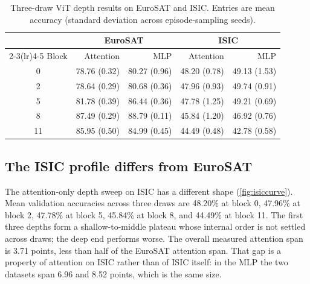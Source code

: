 \documentclass[11pt]{article}
\begin{document}
\begin{table}[t]
\centering
\small
\caption{Three-draw ViT depth results on EuroSAT and ISIC. Entries are mean accuracy (standard deviation across episode-sampling seeds).}
\label{tab:depthmeans}
\begin{tabular}{crrrr}
\toprule
& \multicolumn{2}{c}{EuroSAT} & \multicolumn{2}{c}{ISIC}\\
\cmidrule(lr){2-3}\cmidrule(lr){4-5}
Block & Attention & MLP & Attention & MLP\\
\midrule
0 & 78.76 (0.32) & 80.27 (0.96) & 48.20 (0.78) & 49.13 (1.53)\\
2 & 78.64 (0.29) & 80.68 (0.36) & 47.96 (0.93) & 49.74 (0.91)\\
5 & 81.78 (0.39) & 86.44 (0.36) & 47.78 (1.25) & 49.21 (0.69)\\
8 & 87.49 (0.29) & 88.79 (0.11) & 45.84 (1.20) & 46.92 (0.76)\\
11 & 85.95 (0.50) & 84.99 (0.45) & 44.49 (0.48) & 42.78 (0.58)\\
\bottomrule
\end{tabular}
\end{table}

\subsection{The ISIC profile differs from EuroSAT}
\label{sec:isicdepth}

The attention-only depth sweep on ISIC has a different shape (\cref{fig:isiccurve}). Mean validation accuracies across three draws are 48.20\% at block 0, 47.96\% at block 2, 47.78\% at block 5, 45.84\% at block 8, and 44.49\% at block 11. The first three depths form a shallow-to-middle plateau whose internal order is not settled across draws; the deep end performs worse. The overall measured attention span is 3.71 points, less than half of the EuroSAT attention span. That gap is a property of attention on ISIC rather than of ISIC itself: in the MLP the two datasets span 6.96 and 8.52 points, which is the same size.
\end{document}
